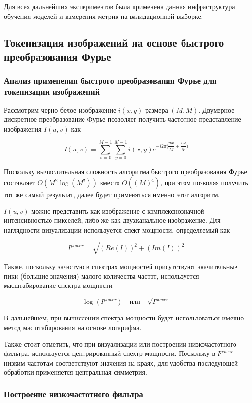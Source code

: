 Для всех дальнейших экспериментов была применена данная инфраструктура обучения моделей и измерения метрик на валидационной выборке.


\subsection{Токенизация изображений на основе быстрого преобразования Фурье}

\subsubsection{Анализ применения быстрого преобразования Фурье для токенизации изображений}

Рассмотрим черно-белое изображение $i(x, y)$ размера $(M, M)$. Двумерное дискретное преобразование Фурье \cite{gonzalez_woods} позволяет получить частотное представление изображения $I(u, v)$ как

$$
I(u, v) = \sum_{x=0}^{M-1}\sum_{y=0}^{M-1} i(x, y) e^{-i2\pi\Big(\dfrac{ux}{M} + \dfrac{vx}{M}\Big)}
$$

Поскольку вычислительная сложность алгоритма быстрого преобразования Фурье \cite{fft} составляет $O(M^2 \log(M^2))$ вместо $O((M)^4)$, при этом позволяя получить тот же самый результат, далее будет применяться именно этот алгоритм. 

$I(u, v)$ можно представить как изображение с комплекснозначной интенсивностью пикселей, либо же как двухканальное изображение. Для наглядности визуализации используется спект мощности, определяемый как 

$$
I^{power} = \sqrt{(Re(I))^2 + (Im(I))^2}
$$

Также, поскольку зачастую в спектрах мощностей присутствуют значительные пики (большие значения) малого количества частот, используется масштабирование спектра мощности

$$
\log(I^{power}) \quad \text{или} \quad \sqrt{I^{power}}
$$

В дальнейшем, при вычислении спектра мощности будет использоваться именно метод масштабирования на основе логарифма.

Также стоит отметить, что при визуализации или построении низкочастотного фильтра, используется центрированный спектр мощности. Поскольку в $I^{power}$ низким частотам соответствуют значения на краях, для удобства последующей обработки применяется центральная симметрия.

\subsubsection{Построение низкочастотного фильтра}

